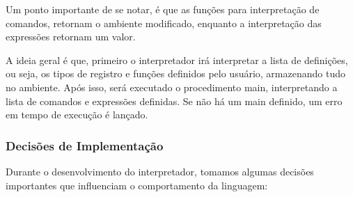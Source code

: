 \documentclass{article}
\begin{document}
Um ponto importante de se notar, é que as funções para interpretação de comandos, retornam o ambiente modificado, enquanto a interpretação das expressões retornam um valor.

A ideia geral é que, primeiro o interpretador irá interpretar a lista de definições, ou seja, os tipos de registro e funções definidos pelo usuário, armazenando tudo no ambiente. Após isso, será executado o procedimento main, interpretando a lista de comandos e expressões definidas. Se não há um main definido, um erro em tempo de execução é lançado.

\subsubsection{Decisões de Implementação}

Durante o desenvolvimento do interpretador, tomamos algumas decisões importantes que influenciam o comportamento da linguagem:
\end{document}
